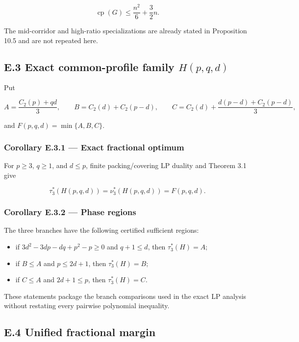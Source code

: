 \documentclass[english,11pt,a4paper]{article}
\providecommand{\tightlist}{\setlength{\itemsep}{0pt}\setlength{\parskip}{0pt}}
\begin{document}
\[
\operatorname{cp}(G)\le \frac{n^2}{6}+\frac32n.
\]

The mid-corridor and high-ratio specializations are already stated in
Proposition 10.5 and are not repeated here.

\subsection{\texorpdfstring{E.3 Exact common-profile family
\(H(p,q,d)\)}{E.3 Exact common-profile family H(p,q,d)}}\label{e.3-exact-common-profile-family-hpqd}

Put

\[
A=\frac{C_2(p)+qd}{3},\qquad
B=C_2(d)+C_2(p-d),\qquad
C=C_2(d)+\frac{d(p-d)+C_2(p-d)}{3},
\]

and \(F(p,q,d)=\min\{A,B,C\}\).

\subsubsection{Corollary E.3.1 --- Exact fractional
optimum}\label{corollary-e.3.1-exact-fractional-optimum}

For \(p\ge3\), \(q\ge1\), and \(d\le p\), finite packing/covering LP
duality and Theorem 3.1 give

\[
\tau_3^*(H(p,q,d))=\nu_3^*(H(p,q,d))=F(p,q,d).
\]

\subsubsection{Corollary E.3.2 --- Phase
regions}\label{corollary-e.3.2-phase-regions}

The three branches have the following certified sufficient regions:

\begin{itemize}
\tightlist
\item
  if \(3d^2-3dp-dq+p^2-p\ge0\) and \(q+1\le d\), then \(\tau_3^*(H)=A\);
\item
  if \(B\le A\) and \(p\le2d+1\), then \(\tau_3^*(H)=B\);
\item
  if \(C\le A\) and \(2d+1\le p\), then \(\tau_3^*(H)=C\).
\end{itemize}

These statements package the branch comparisons used in the exact LP
analysis without restating every pairwise polynomial inequality.

\subsection{E.4 Unified fractional
margin}\label{e.4-unified-fractional-margin}
\end{document}
